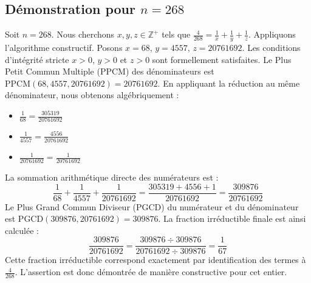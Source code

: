 \documentclass[11pt,a4paper]{article}
\begin{document}
\subsection{Démonstration pour $n = 268$}
Soit $n = 268$. Nous cherchons $x, y, z \in \mathbb{Z}^{+}$ tels que $\frac{4}{268} = \frac{1}{x} + \frac{1}{y} + \frac{1}{z}$.
Appliquons l'algorithme constructif. Posons $x = 68$, $y = 4557$, $z = 20761692$.
Les conditions d'intégrité stricte $x > 0$, $y > 0$ et $z > 0$ sont formellement satisfaites.
Le Plus Petit Commun Multiple (PPCM) des dénominateurs est $\text{PPCM}(68, 4557, 20761692) = 20761692$.
En appliquant la réduction au même dénominateur, nous obtenons algébriquement :
\begin{itemize}
    \item $\frac{1}{68} = \frac{305319}{20761692}$
    \item $\frac{1}{4557} = \frac{4556}{20761692}$
    \item $\frac{1}{20761692} = \frac{1}{20761692}$
\end{itemize}
La sommation arithmétique directe des numérateurs est :
$$ \frac{1}{68} + \frac{1}{4557} + \frac{1}{20761692} = \frac{305319 + 4556 + 1}{20761692} = \frac{309876}{20761692} $$
Le Plus Grand Commun Diviseur (PGCD) du numérateur et du dénominateur est $\text{PGCD}(309876, 20761692) = 309876$.
La fraction irréductible finale est ainsi calculée :
$$ \frac{309876}{20761692} = \frac{309876 \div 309876}{20761692 \div 309876} = \frac{1}{67} $$
Cette fraction irréductible correspond exactement par identification des termes à $\frac{4}{268}$. L'assertion est donc démontrée de manière constructive pour cet entier.
\end{document}
